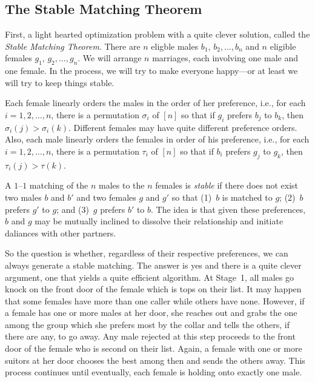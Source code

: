 \subsection{The Stable Matching Theorem}

First, a light hearted optimization problem with a quite
clever solution, called the \textit{Stable Matching Theorem}.  
There are $n$ eligble males $b_1$, $b_2,\dots,b_n$ and
$n$ eligible females $g_1$, $g_2,\dots,g_n$.  We will arrange $n$
marriages, each involving one male and one female. In the process,
we will try to make everyone happy---or at least we will try to
keep things stable.

Each female linearly orders the males in the order of her preference, i.e.,
for each $i=1,2,\dots,n$, there is a permutation $\sigma_i$ of
$[n]$ so that if $g_i$ prefers $b_j$ to $b_k$, then $\sigma_i(j)>
\sigma_i(k)$.  Different females may have quite different
preference orders.  Also, each male linearly orders the females in order of   
his preference, i.e., for each $i=1,2,\dots,n$, there is a permutation
$\tau_i$ of $[n]$ so that if $b_i$ prefers $g_j$ to $g_k$, then
$\tau_i(j)>\tau(k)$.

A $1$--$1$ matching of the $n$ males to the $n$ females is \textit{stable}
if there does not exist two males $b$ and $b'$ and two females
$g$ and $g'$ so that (1)~$b$ is matched to $g$; (2)~$b$ prefers $g'$ to
$g$; and (3)~$g$ prefers $b'$ to $b$.  The idea is that given these
preferences, $b$ and $g$ may be mutually inclined to dissolve their relationship
and initiate daliances with other partners.

So the question is whether, regardless of their respective preferences, we can always
generate a stable matching.  The answer is yes and there is a quite
clever argument, one that yields a quite efficient algorithm.
At Stage~1, all males go knock on the front door of the female which
is tops on their list.  It may happen that some females have more than
one caller while others have none.  However, if a female has
one or more males at her door, she reaches out and grabs the one
among the group which she prefers most by the collar and tells the others, if there
are any, to go away.  Any male rejected at this step proceeds to the
front door of the female who is second on their list.  Again, a female
with one or more suitors at her door chooses the best among then
and sends the others away.  This process continues until eventually,
each female is holding onto exactly one male.

